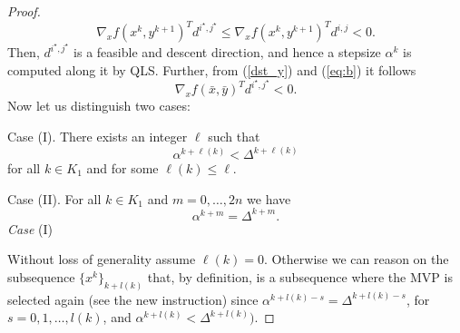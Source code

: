 \begin{proof}
\begin{equation}
 \nabla_xf(x^k,y^{k+1})^Td^{i^\star,j^\star}\le \nabla_xf(x^k,y^{k+1})^Td^{i,j}<0.
\end{equation}
Then, $d^{i^\star,j^\star}$ is a feasible and descent direction, and hence a stepsize $\alpha^k$ is computed along it by QLS.
Further, from (\ref{dst_y}) and (\ref{eq:b}) it follows
\begin{equation}\label{desc_mvp}
 \nabla_xf(\bar x,\bar y)^Td^{i^\star,j^\star}<0.
\end{equation}
Now let us distinguish two cases:
\par\medskip\noindent
Case (I). There exists an integer $\ell$  such that
\begin{equation}\label{caseI}
 \alpha^{k+\ell(k)}<\Delta^{k+\ell(k)}
\end{equation}
for all $k\in K_1$ and for some $\ell(k)\le \ell$.
\par\medskip\noindent 
Case (II). For all $k\in K_1$ and $m=0,\ldots ,2n$ we have
\begin{equation}\label{caseII}
 \alpha^{k+m}=\Delta^{k+m}.
\end{equation}
{\it Case} (I)
\par\medskip\noindent
Without loss of generality assume $\ell (k)=0$.
Otherwise we can reason on the subsequence $\{x^k\}_{k+l(k)}$ that, by definition,
is a subsequence where the  MVP is selected again (see the new instruction) since $\alpha^{k+l(k)-s}=\Delta^{k+l(k)-s}$,
for $s=0,1,\ldots ,l(k)$,
and $\alpha^{k+l(k)}<\Delta^{k+l(k)})$.


\end{proof}
